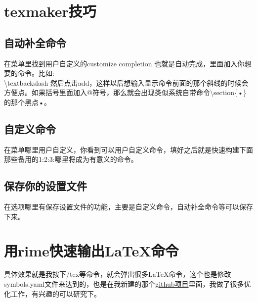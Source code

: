 \documentclass[12pt,oneside]{book}
\begin{document}
\begin{common-format}
\section{texmaker技巧}
\subsection{自动补全命令}
在菜单里找到用户自定义的customize completion 也就是自动完成，里面加入你想要的命令。比如:\\
\textbackslash textbackslash 然后点击add，这样以后想输入显示命令前面的那个斜线的时候会方便点。如果括号里面加入@符号，那么就会出现类似系统自带命令\textbackslash section\{•\}的那个黑点•。

\subsection{自定义命令}
在菜单哪里用户自定义，你看到可以用户自定义命令，填好之后就是快速构建下面那些备用的1:2:3:哪里将成为有意义的命令。

\subsection{保存你的设置文件}
在选项哪里有保存设置文件的功能，主要是自定义命令，自动补全命令等可以保存下来。

\section{用rime快速输出\LaTeX 命令}
具体效果就是我按下/tex等命令，就会弹出很多\LaTeX 命令，这个也是修改symbols.yaml文件来达到的，也是在我新建的那个\href{https://github.com/a358003542/rime-symbols-yaml}{github项目}里面，我做了很多优化工作，有兴趣的可以研究下。



\end{common-format}
\end{document}
